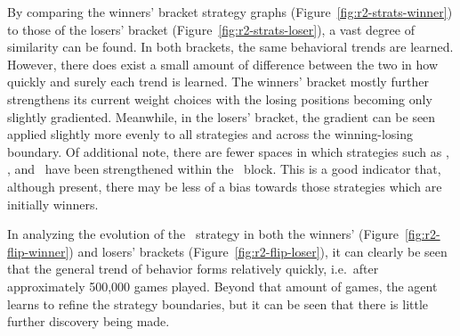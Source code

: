 By comparing the winners' bracket strategy graphs
(Figure~\ref{fig:r2-strats-winner})
to those of the losers' bracket
(Figure~\ref{fig:r2-strats-loser}),
a vast degree of similarity can be found.
%
In both brackets,
the same behavioral trends are learned.
%
However,
there does exist a small amount of difference between the two
in how quickly and surely each trend is learned.
%
The winners' bracket mostly further strengthens its current weight choices
with the losing positions becoming only slightly gradiented.
%
Meanwhile,
in the losers' bracket,
the gradient can be seen applied slightly more evenly to all strategies
and
across the winning-losing boundary.
%
Of additional note,
there are fewer spaces in which
strategies such as \cribminavg, \peggingmaxavggained, and \peggingminavggiven\ 
have been strengthened within the \handmaxmin\ block.
%
This is a good indicator that,
although present,
there may be less of a bias towards those strategies which are initially winners.

%


In analyzing the evolution of the \handmaxavg\ strategy in both the winners'
(Figure~\ref{fig:r2-flip-winner})
and losers' brackets (Figure~\ref{fig:r2-flip-loser}),
it can clearly be seen that the general trend of behavior forms
relatively quickly,
i.e.\  after approximately 500,000 games played.
%
Beyond that amount of games,
the agent learns to refine the strategy boundaries,
but it can be seen that there is little further discovery being made.






%





